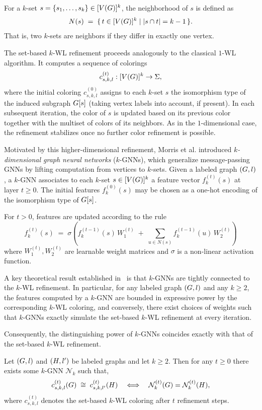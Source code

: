 For a $k$-set $s = \{s_1,\dots,s_k\} \in [V(G)]^k$, the neighborhood of $s$ is defined as
\[
N(s) \;=\; \{\, t \in [V(G)]^k \mid |s \cap t| = k-1 \,\}.
\]
That is, two $k$-sets are neighbors if they differ in exactly one vertex.

The set-based $k$-WL refinement proceeds analogously to the classical $1$-WL algorithm. It computes a sequence of colorings
\[
c^{(t)}_{s,k,l} : [V(G)]^k \rightarrow \Sigma,
\]
where the initial coloring $c^{(0)}_{s,k,l}$ assigns to each $k$-set $s$ the isomorphism type of the induced subgraph $G[s]$ (taking vertex labels into account, if present). In each subsequent iteration, the color of $s$ is updated based on its previous color together with the multiset of colors of its neighbors. As in the $1$-dimensional case, the refinement stabilizes once no further color refinement is possible.

Motivated by this higher-dimensional refinement, Morris et al. introduced \emph{$k$-dimensional graph neural networks} ($k$-GNNs), which generalize message-passing GNNs by lifting computation from vertices to $k$-sets. Given a labeled graph $(G,l)$, a $k$-GNN associates to each $k$-set $s \in [V(G)]^k$ a feature vector $f_k^{(t)}(s)$ at layer $t \ge 0$. The initial features $f_k^{(0)}(s)$ may be chosen as a one-hot encoding of the isomorphism type of $G[s]$.

For $t > 0$, features are updated according to the rule
\[
f_k^{(t)}(s)
\;=\;
\sigma\!\left(
f_k^{(t-1)}(s)\, W_1^{(t)}
\;+\;
\sum_{u \in N(s) } f_k^{(t-1)}(u)\, W_2^{(t)}
\right)
\]
where $W_1^{(t)}, W_2^{(t)}$ are learnable weight matrices and $\sigma$ is a non-linear activation function. 

A key theoretical result established in~\cite{MorrisEtAl2019} is that $k$-GNNs are tightly connected to the $k$-WL refinement. In particular, for any labeled graph $(G,l)$ and any $k \ge 2$, the features computed by a $k$-GNN are bounded in expressive power by the corresponding $k$-WL coloring, and conversely, there exist choices of weights such that $k$-GNNs exactly simulate the set-based $k$-WL refinement at every iteration.

Consequently, the distinguishing power of $k$-GNNs coincides exactly with that of the set-based $k$-WL refinement.


\begin{proposition}
\label{prop:kGNN-iff-kWL}
Let $(G,l)$ and $(H,l')$ be labeled graphs and let $k \ge 2$. Then for any $t \ge 0$ there exists some $k$-GNN $\mathcal{N}_k$ such that,
\[
c^{(t)}_{s,k,l}(G) \;\cong\; c^{(t)}_{s,k,l'}(H)
\quad\Longleftrightarrow\quad
\mathcal{N}_k^{(t)}(G) = \mathcal{N}_k^{(t)}(H),
\]
where $c^{(t)}_{s,k,l}$ denotes the set-based $k$-WL coloring after $t$ refinement steps.
\end{proposition}







